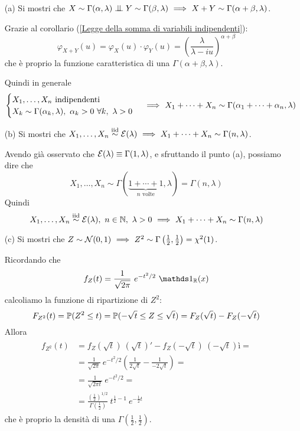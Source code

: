 \begin{enumerate}

\item [(a)] Si mostri che $X\sim\Gamma(\alpha,\lambda)\indep Y\sim\Gamma(\beta,\lambda)\SE X+Y\sim\Gamma(\alpha+\beta,\lambda)$.

Grazie al corollario (\ref{Legge della somma di variabili indipendenti}):
\[
\varphi_{X+Y}(u)=\varphi_X(u)\cdot\varphi_Y(u)=\left(\frac{\lambda}{\lambda-iu}\right)^{\alpha+\beta}
\]
che è proprio la funzione caratteristica di una $\Gamma(\alpha+\beta,\lambda)$.

Quindi in generale
\[
\begin{cases}X_1,\dots,X_n\text{ indipendenti}\\X_k\sim\Gamma(\alpha_k,\lambda),\ \alpha_k>0\ \forall k,\ \lambda>0\end{cases} \ \Longrightarrow\  X_1+\cdots+X_n\sim\Gamma(\alpha_1+\cdots+\alpha_n,\lambda)
\]

\item [(b)] Si mostri che $X_1,\dots,X_n\stackrel{\mathrm{iid}}{\sim}\mathcal{E}(\lambda)\ \Longrightarrow\  X_1+\cdots+X_n\sim\Gamma(n,\lambda)$.

Avendo già osservato che $\mathcal{E}(\lambda)\equiv\Gamma(1,\lambda)$, e sfruttando il punto (a), possiamo dire che
\[
X_1,\dots,X_n\sim\Gamma(\underbrace{1+\cdots+1}_{n\text{ volte}},\lambda)=\Gamma(n,\lambda)
\]
Quindi
\[
X_1,\dots,X_n\iid\EEE(\lambda),\ n\in\NN,\ \lambda>0\SE X_1+\cdots+X_n\sim\Gamma(n,\lambda)
\]

\item [(c)] Si mostri che $Z\sim\mathcal{N}(0,1)\ \Longrightarrow\  Z^2\sim\Gamma\left(\frac{1}{2},\frac{1}{2}\right)=\chi^2(1)$.

Ricordando che
\[
f_Z(t)=\frac{1}{\sqrt{2\pi}}\ e^{-t^2/2}\ \Ind_\RR(x)
\]
calcoliamo la funzione di ripartizione di $Z^2$:
\[
F_{Z^2}(t)=\mathbb{P}(Z^2\leq t)=\mathbb{P}(-\sqrt{t}\leq Z\leq\sqrt{t})=F_Z(\sqrt{t})-F_Z(-\sqrt{t})
\]
Allora
\begin{gather*}
\begin{aligned}
f_{Z^2}(t)&=f_Z(\sqrt{t})\ (\sqrt{t})'-f_Z(-\sqrt{t})\ (-\sqrt{t})ì=\\
&=\frac{1}{\sqrt{2\pi}}\ e^{-t^2/2}\left(\frac{1}{2\sqrt{t}}-\frac{1}{-2\sqrt{t}}  \right)=\\
&=\frac{1}{\sqrt{2\pi t}}\ e^{-t^2/2}=\\
&=\frac{\left( \frac{1}{2}  \right)^{1/2}}{\Gamma\left( \frac{1}{2}  \right)}\ t^{\frac{1}{2}-1}\ e^{-\frac{1}{2}t}
\end{aligned}
\end{gather*}
che è proprio la densità di una $\Gamma\left(\frac{1}{2},\frac{1}{2} \right)$.


\end{enumerate}
